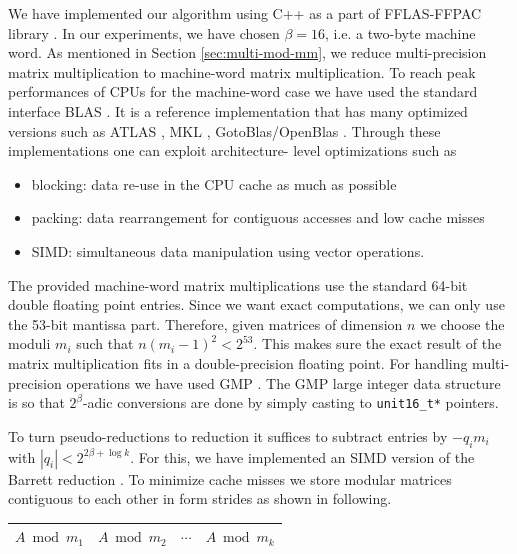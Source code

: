 \documentclass[acmtoms]{acmsmall}
\begin{document}
We have implemented our algorithm using C++ as a part of FFLAS-FFPAC library \cite{fflas-ffpack}. 
In our experiments, we have chosen $\beta = 16$, i.e. a two-byte machine word. As mentioned in 
Section \ref{sec:multi-mod-mm}, we reduce multi-precision matrix multiplication to machine-word 
matrix multiplication. To reach peak performances of CPUs for the machine-word case we have used 
the standard interface BLAS \cite{Dongarra1988}. It is a reference implementation that has many 
optimized versions such as ATLAS \cite{Whaley2001}, MKL \cite{IntelMKL2007}, 
GotoBlas/OpenBlas \cite{Goto2008}. Through these implementations one can exploit architecture- 
level optimizations such as
\begin{itemize}
	\item blocking: data re-use in the CPU cache as much as possible
	\item packing: data rearrangement for contiguous accesses and low cache misses
	\item SIMD: simultaneous data manipulation using vector operations.
\end{itemize}
The provided machine-word matrix multiplications use the standard 64-bit double floating point 
entries. Since we want exact computations, we can only use the 53-bit mantissa part. Therefore, 
given matrices of dimension $n$ we choose the moduli $m_i$ such that $n(m_i - 1)^2 <  2^{53}$. This 
makes sure the exact result of the matrix multiplication fits in a double-precision floating point. 
For handling multi-precision operations we have used GMP \cite{GNU-GMP}. The GMP large integer data 
structure is so that $2^\beta$-adic conversions are done by simply casting to \verb|unit16_t*| 
pointers.

To turn pseudo-reductions to reduction it suffices to subtract entries by $-q_im_i$ with $|q_i| < 
2^{2\beta + \log k}$. For this, we have implemented an SIMD version of the Barrett reduction 
\cite{Barrett86}. To minimize cache misses we store modular matrices contiguous to each other in 
form strides as shown in following.

\begin{center}
	\renewcommand{\arraystretch}{1.5}
	\begin{tabular}{|c|c|c|c|}
		\hline
		$A \bmod m_1$ & $A \bmod m_2$ & \hspace*{2mm} $\cdots$ \hspace*{2mm} & $A \bmod m_k$ \\
		\hline
	\end{tabular}
\end{center}
\end{document}
